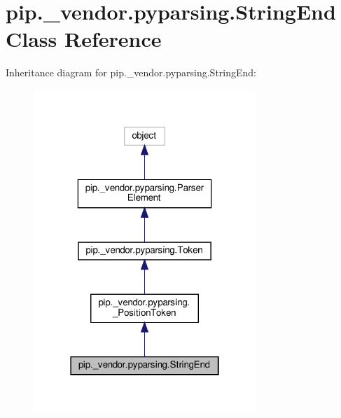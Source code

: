 \hypertarget{classpip_1_1__vendor_1_1pyparsing_1_1StringEnd}{}\section{pip.\+\_\+vendor.\+pyparsing.\+String\+End Class Reference}
\label{classpip_1_1__vendor_1_1pyparsing_1_1StringEnd}


Inheritance diagram for pip.\+\_\+vendor.\+pyparsing.\+String\+End\+:
\nopagebreak
\begin{figure}[H]
\begin{center}
\leavevmode
\includegraphics[width=238pt]{classpip_1_1__vendor_1_1pyparsing_1_1StringEnd__inherit__graph}
\end{center}
\end{figure}


